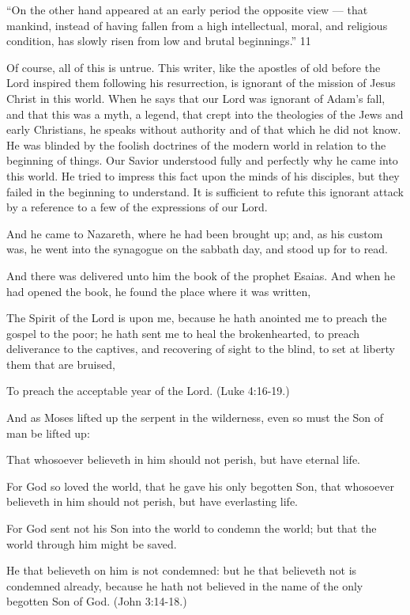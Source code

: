 ``On the other hand appeared at an early period the opposite view — that mankind, instead of
having fallen from a high intellectual, moral, and religious condition, has slowly risen from
low and brutal beginnings.'' 11

Of course, all of this is untrue. This writer, like the apostles of old before the Lord inspired
them following his resurrection, is ignorant of the mission of Jesus Christ in this world.
When he says that our Lord was ignorant of Adam's fall, and that this was a myth, a legend,
that crept into the theologies of the Jews and early Christians, he speaks without authority
and of that which he did not know. He was blinded by the foolish doctrines of the modern
world in relation to the beginning of things. Our Savior understood fully and perfectly why
he came into this world. He tried to impress this fact upon the minds of his disciples, but they
failed in the beginning to understand. It is sufficient to refute this ignorant attack by a
reference to a few of the expressions of our Lord.

And he came to Nazareth, where he had been brought up; and, as his custom was, he went
into the synagogue on the sabbath day, and stood up for to read.

And there was delivered unto him the book of the prophet Esaias. And when he had opened
the book, he found the place where it was written,

The Spirit of the Lord is upon me, because he hath anointed me to preach the gospel to the
poor; he hath sent me to heal the brokenhearted, to preach deliverance to the captives, and
recovering of sight to the blind, to set at liberty them that are bruised,

To preach the acceptable year of the Lord. (Luke 4:16-19.)

And as Moses lifted up the serpent in the wilderness, even so must the Son of man be lifted
up:

That whosoever believeth in him should not perish, but have eternal life.

For God so loved the world, that he gave his only begotten Son, that whosoever believeth in
him should not perish, but have everlasting life.

For God sent not his Son into the world to condemn the world; but that the world through
him might be saved.

He that believeth on him is not condemned: but he that believeth not is condemned already,
because he hath not believed in the name of the only begotten Son of God. (John 3:14-18.)


